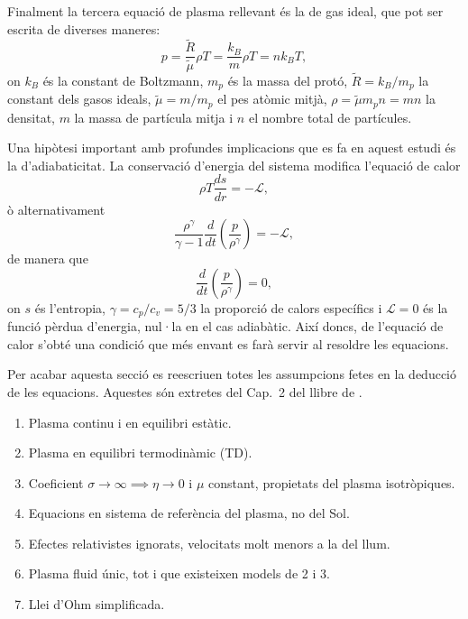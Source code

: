 \documentclass[12pt,a4paper]{article}
\numberwithin{equation}{section}
\begin{document}
Finalment la tercera equació de plasma rellevant és la de gas ideal, que pot ser escrita de diverses maneres:
\begin{equation}
    p = \frac{\tilde{R}}{\tilde{\mu}} \rho T = \frac{k_B}{m} \rho T = n k_B T, \tag{2.11} \label{eq.2.11}
\end{equation}
on $k_B$ és la constant de Boltzmann, $m_p$ és la massa del protó, $\tilde{R} = k_B/m_p$ la constant dels gasos ideals, $\tilde{\mu} = m/m_p$ el pes atòmic
mitjà, $\rho = \tilde{\mu} m_p n = m n$ la densitat, $m$ la massa de partícula mitja i $n$ el nombre total de partícules.


Una hipòtesi important amb profundes implicacions que es fa en aquest estudi és la d'adiabaticitat. La conservació d'energia del sistema modifica l'equació de calor
\begin{equation}
    \rho T \frac{ds}{dr} = - \mathcal{L}, \tag{2.12} \label{eq.2.12}
\end{equation}
ò alternativament
\begin{equation}
    \frac{\rho^\gamma}{\gamma - 1} \frac{d}{dt} \left( \frac{p}{\rho^\gamma} \right) = - \mathcal{L}, \tag{2.13} \label{eq.2.13}
\end{equation}
de manera que
\begin{equation}
    \frac{d}{dt} \left( \frac{p}{\rho^\gamma} \right) = 0, \tag{2.14} \label{eq.2.14}
\end{equation}
on $s$ és l'entropia, $\gamma = c_p/c_v = 5/3$ la proporció de calors específics i $\mathcal{L}=0$ és la funció pèrdua d'energia, nul·la en el cas adiabàtic.
Així doncs, de l'equació de calor s'obté una condició que més envant es farà servir al resoldre les equacions.


Per acabar aquesta secció es reescriuen totes les assumpcions fetes en la deducció de les equacions.
Aquestes són extretes del Cap.~2 del llibre de \textcite{Priest_2014}.
\begin{enumerate}[label=\Roman*.]
    \item \label{punt:I} Plasma continu i en equilibri estàtic.
    \item \label{punt:II} Plasma en equilibri termodinàmic (TD).
    \item \label{punt:III} Coeficient $\sigma \rightarrow \infty \implies \eta \rightarrow 0$ i $\mu$ constant, propietats del plasma isotròpiques.
    \item \label{punt:IV} Equacions en sistema de referència del plasma, no del Sol.
    \item \label{punt:V} Efectes relativistes ignorats, velocitats molt menors a la del llum.
    \item \label{punt:VI} Plasma fluid únic, tot i que existeixen models de 2 i 3.
    \item \label{punt:VII} Llei d'Ohm simplificada.
\end{enumerate}
\end{document}
